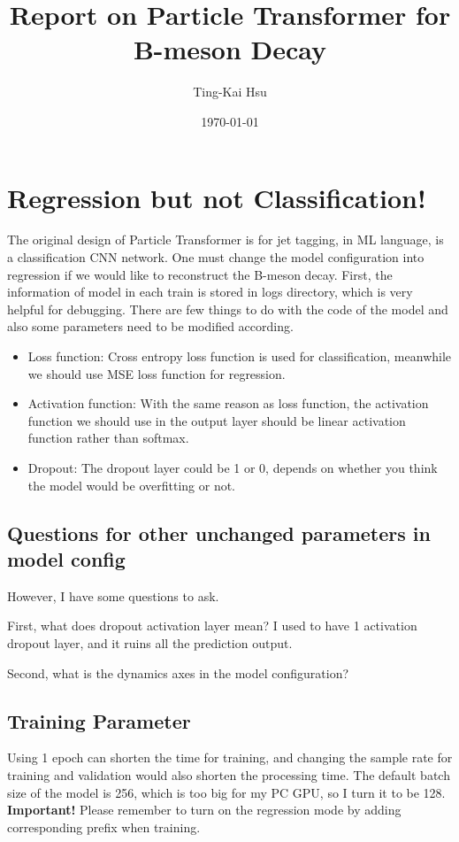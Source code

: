 \documentclass[12pt]{article}
\title{Report on Particle Transformer for B-meson Decay}
\author{Ting-Kai Hsu}
\date{\today}
\numberwithin{equation}{section}
\begin{document}
\maketitle
\tableofcontents
\section{Regression but not Classification!}
The original design of Particle Transformer is for jet tagging, in ML language, is a classification CNN network.
One must change the model configuration into regression if we would like to reconstruct the B-meson decay.
First, the information of model in each train is stored in logs directory, which is very helpful for debugging.
There are few things to do with the code of the model and also some parameters need to be modified according.
\begin{itemize}
    \item Loss function: Cross entropy loss function is used for classification, meanwhile we should use MSE loss function for regression.
    \item Activation function: With the same reason as loss function, the activation function we should use in the output layer should be linear activation function rather than softmax.
    \item Dropout: The dropout layer could be 1 or 0, depends on whether you think the model would be overfitting or not.
\end{itemize}
\subsection{Questions for other unchanged parameters in model config}
However, I have some questions to ask.

First, what does dropout activation layer mean?
I used to have 1 activation dropout layer, and it ruins all the prediction output.

Second, what is the dynamics axes in the model configuration?

\subsection{Training Parameter}
Using 1 epoch can shorten the time for training, and changing the sample rate for training and validation would also shorten the processing time.
The default batch size of the model is 256, which is too big for my PC GPU, so I turn it to be 128.
\textbf{Important!} Please remember to turn on the regression mode by adding corresponding prefix when training.
\end{document}
